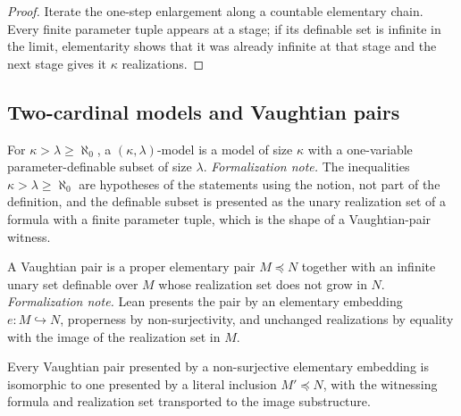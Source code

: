 \begin{proof}
\leanok
{}
Iterate the one-step enlargement along a countable elementary chain.
Every finite parameter tuple appears at a stage; if its definable set is
infinite in the limit, elementarity shows that it was already infinite
at that stage and the next stage gives it \(\kappa\) realizations.
\end{proof}

\subsection{Two-cardinal models and Vaughtian pairs}

\begin{definition}
\label{def:kappa-lambda-model}
\leanok
For \(\kappa>\lambda\geq\aleph_0\), a \((\kappa,\lambda)\)-model is a
model of size \(\kappa\) with a one-variable parameter-definable subset
of size \(\lambda\).
\emph{Formalization note.}  The inequalities \(\kappa>\lambda\geq\aleph_0\)
are hypotheses of the statements using the notion, not part of the
definition, and the definable subset is presented as the unary
realization set of a formula with a finite parameter tuple, which is the
shape of a Vaughtian-pair witness.
\end{definition}

\begin{definition}
\label{def:vaughtian-pair}
\leanok
{}
A Vaughtian pair is a proper elementary pair \(M\preceq N\) together
with an infinite unary set definable over \(M\) whose realization set
does not grow in \(N\).
\emph{Formalization note.}  Lean presents the pair by an elementary
embedding \(e:M\hookrightarrow N\), properness by non-surjectivity, and
unchanged realizations by equality with the image of the realization set
in \(M\).
\end{definition}

\begin{lemma}
\label{lem:vaughtian-pair-inclusion-presentation}
Every Vaughtian pair presented by a non-surjective elementary embedding
is isomorphic to one presented by a literal inclusion \(M'\preceq N\),
with the witnessing formula and realization set transported to the image
substructure.
\end{lemma}

